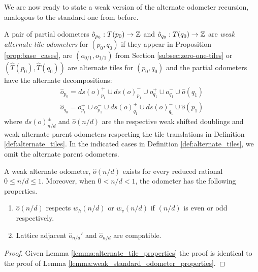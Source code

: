 \documentclass[12pt]{amsart}
\begin{document}
We are now ready to state a weak version of the alternate odometer recursion, analogous to the standard one from before. 
\begin{definition} \label{def:weak_alternate_odometers}
	A pair of partial odometers $\hat{o}_{p_0}:T(p_0) \to \mathbb{Z}$ and $\hat{o}_{q_0}: T(q_0) \to \mathbb{Z}$ 
are {\it weak alternate tile odometers} for $(p_0, q_0)$ if they appear in Proposition \ref{prop:base_cases}, are $(o_{0/1}, o_{1/1})$ from Section \ref{subsec:zero-one-tiles} or $(\hat{T}(p_0), \hat{T}(q_0))$ are alternate tiles 
for $(p_0,q_0)$ and the partial odometers have the alternate decompositions:
\begin{equation}\label{eq:alt_odometer_decomposition}
\begin{aligned}
\hat{o}_{p_0} = ds(o)_{p_1}^+ \cup ds(o)_{p_1}^- \cup o_{q_1}^+ \cup o_{q_1}^- \cup \hat{o}(q_1)  \\
\hat{o}_{q_0} =  o_{p_1}^+ \cup o_{p_1}^- \cup ds(o)_{q_1}^+ \cup ds(o)_{q_1}^- \cup \hat{o}(p_1) 
\end{aligned}
\end{equation}
where $ds(o)_{n/d}^{\pm}$ and $\hat{o}(n/d)$ are the respective weak shifted doublings and weak alternate parent odometers
respecting the tile translations in Definition \ref{def:alternate_tiles}. 
In the indicated cases in Definition \ref{def:alternate_tiles}, we omit the alternate parent odometers. 


\end{definition}



\begin{lemma} \label{lemma:weak_alternate_odometer_properties}
	A weak alternate odometer, $\hat{o}(n/d)$ exists for every reduced rational $0 \leq n/d \leq 1$. Moreover, 
	when $0 < n/d < 1$, the odometer has the following properties. 
	\begin{enumerate}[label=(\alph*)]
		\item $\hat{o}(n/d)$ respects $w_{h}(n/d)$ or $w_v(n/d)$ if $(n/d)$ is even or odd respectively.
		\item Lattice adjacent $\hat{o}_{n/d}'$ and $\hat{o}_{n/d}$ are compatible. 
	\end{enumerate}
\end{lemma}

\begin{proof}	
	Given Lemma \ref{lemma:alternate_tile_properties} the proof is identical to the proof of Lemma \ref{lemma:weak_standard_odometer_properties}.
\end{proof}
\end{document}
